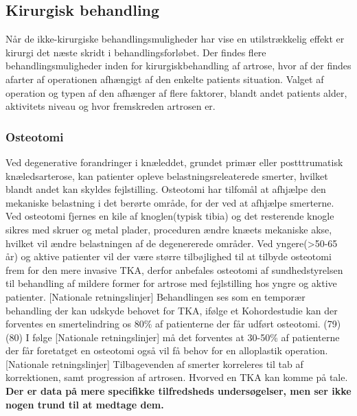 %

\subsection{Kirurgisk behandling}

Når de ikke-kirurgiske behandlingsmuligheder har vise en utilstrækkelig effekt er kirurgi det næste skridt i behandlingsforløbet. Der findes flere behandlingsmuligheder inden for kirurgiskbehandling af artrose, hvor af der findes afarter af operationen afhængigt af den enkelte patients situation. Valget af operation og typen af den afhænger af flere faktorer, blandt andet patients alder, aktivitets niveau og hvor fremskreden artrosen er.

\subsubsection{Osteotomi}
Ved degenerative forandringer i knæleddet, grundet primær eller postttrumatisk knæledsarterose, kan patienter opleve belastningsreleaterede smerter, hvilket blandt andet kan skyldes fejlstilling. Osteotomi har tilfomål at afhjælpe den mekaniske belastning i det berørte område, for der ved at afhjælpe smerterne. Ved osteotomi fjernes en kile af knoglen(typisk tibia) og det resterende knogle sikres med skruer og metal plader, proceduren ændre knæets mekaniske akse, hvilket vil ændre belastningen af de degenererede områder.\citep{Osteotomi_og_TKA} Ved yngere(>50-65 år)\citep{Osteotomi_og_TKA} og aktive patienter vil der være større tilbøjlighed til at tilbyde osteotomi frem for den mere invasive TKA, derfor anbefales osteotomi af sundhedstyrelsen til behandling af mildere former for artrose med fejlstilling hos yngre og aktive patienter. [Nationale retningslinjer] Behandlingen ses som en temporær behandling der kan udskyde behovet for TKA, ifølge et Kohordestudie kan der forventes en smertelindring os 80\% af patienterne der får udført osteotomi. (79)(80) I følge [Nationale retningslinjer] må det forventes at 30-50\% af patienterne der får foretatget en osteotomi også vil få behov for en alloplastik operation. [Nationale retningslinjer] Tilbagevenden af smerter korreleres til tab af korrektionen, samt progression af artrosen. Hvorved en TKA kan komme på tale. \citep{Osteotomi_og_TKA} \textbf{Der er data på mere specifikke tilfredsheds undersøgelser, men ser ikke nogen trund til at medtage dem. }

